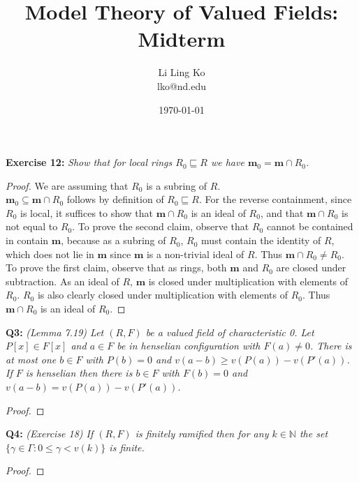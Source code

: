 \documentclass{article}
\begin{document}
\title{Model Theory of Valued Fields: Midterm}
\author{Li Ling Ko\\ lko@nd.edu}
\date{\today}
\maketitle

\textbf{Exercise 12:} \it Show that for local rings $R_0\sqsubseteq R$ we
  have $\bm{m}_0=\bm{m}\cap R_0$.

  \begin{proof}
    We are assuming that $R_0$ is a subring of $R$. \\

    $\bm{m}_0\subseteq\bm{m}\cap R_0$ follows by definition of
    $R_0\sqsubseteq R$. For the reverse containment, since $R_0$ is local,
    it suffices to show that $\bm{m}\cap R_0$ is an ideal of $R_0$, and
    that $\bm{m}\cap R_0$ is not equal to $R_0$. To prove the second
    claim, observe that $R_0$ cannot be contained in contain $\bm{m}$,
    because as a subring of $R_0$, $R_0$ must contain the identity of $R$,
    which does not lie in $\bm{m}$ since $\bm{m}$ is a non-trivial ideal of
    $R$. Thus $\bm{m}\cap R_0\neq R_0$. \\ 

    To prove the first claim, observe that as rings, both $\bm{m}$
    and $R_0$ are closed under subtraction. As an ideal of $R$, $\bm{m}$ is
    closed under multiplication with elements of $R_0$. $R_0$ is also
    clearly closed under multiplication with elements of $R_0$. Thus
    $\bm{m}\cap R_0$ is an ideal of $R_0$.
  \end{proof}

\textbf{Q3:} \it (Lemma 7.19) Let $(R,F)$ be a valued field of
  characteristic 0. Let $P[x]\in F[x]$ and $a\in F$ be in henselian
  configuration with $F(a)\neq0$. There is at most one $b\in F$ with
  $P(b)=0$ and $v(a-b)\geq v(P(a))-v(P'(a))$. If $F$ is henselian then
  there is $b\in F$ with $F(b)=0$ and $v(a-b)=v(P(a))-v(P'(a))$.

  \begin{proof}
  \end{proof}

\textbf{Q4:} \it (Exercise 18) If $(R,F)$ is finitely ramified then for any
  $k\in\mathbb{N}$ the set $\{\gamma\in\Gamma: 0\leq\gamma<v(k)\}$ is finite.

  \begin{proof}
  \end{proof}
\end{document}
